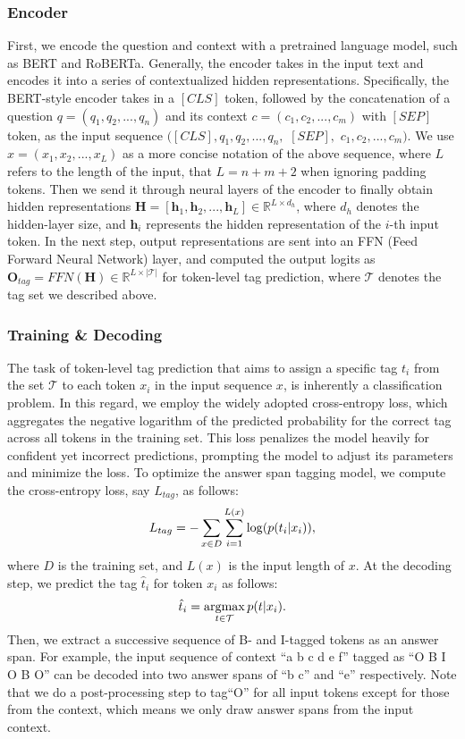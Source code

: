 \documentclass[a4paper]{cas-sc}
\newcommand{\1}[1]{\mathds{1}\left[#1\right]}
\newcommand{\argmax}{\operatornamewithlimits{argmax}}
\begin{document}
\subsubsection{Encoder}
First, we encode the question and context with a pretrained 
language model, such as BERT and RoBERTa.
Generally, the encoder takes in the input text and encodes it into 
a series of contextualized hidden representations.
Specifically, the BERT-style encoder takes in a
$[CLS] $ token, followed by
the concatenation of a question $q=(q_1, q_2, ..., q_n)$ and its context $c=(c_1, c_2, ..., c_m)$ with $[SEP]$  token,
as the input sequence $([CLS], q_1, q_2, ..., q_n, $ $[SEP], $ $c_1, c_2, ..., c_m)$.
We use $x=(x_1, x_2, ..., x_L)$ as a more concise notation of the above sequence, 
where $L$ refers to the length of the input, 
that $L=n+m+2$ when ignoring padding tokens.
Then we send it through neural layers of the encoder to finally obtain hidden representations 
$\mathbf{H}=\left[\mathbf{h}_1, \mathbf{h}_2, ..., \mathbf{h}_{L}\right] 
\in \mathbb{R}^{L\times d_h}$,
where $d_h$ denotes the hidden-layer size, and $\mathbf{h}_i$ represents the hidden representation of the $i$-th input token. 
In the next step, output representations are sent into 
an FFN (Feed Forward Neural Network) layer, 
and computed the output logits as 
$\mathbf{O}_{tag}=FFN(\mathbf{H})\in\mathbb{R}^{L\times |\mathcal{T}|}$ for token-level tag prediction,  
where $\mathcal{T}$ denotes the tag set we described above. 


\subsubsection{Training \& Decoding}
The task of token-level tag prediction that aims to assign a specific tag $t_i$ from the set $\mathcal{T}$ to each token $x_i$ in the input sequence $x$, is inherently a classification problem. In this regard,  we employ the widely adopted cross-entropy loss, which aggregates the negative logarithm of the predicted probability for the correct tag across all tokens in the training set. This loss penalizes the model heavily for confident yet incorrect predictions, prompting the model to adjust its parameters and minimize the loss. To optimize the answer span tagging model, we compute the cross-entropy loss, say $L_{tag}$, as follows:
\begin{equation}\label{eq:tag_loss}
	\centering
	L_{tag}=-\sum_{x\in D}\sum_{i=1}^{L(x)} \log (p(t_i | x_{i})) ,
\end{equation}
where $D$ is the training set, and $L(x)$ is the input length of $x$. 
At the decoding step, we predict the tag $\hat{t}_i$ for token $x_i$ as follows:
\begin{equation}\label{eq:ti1}
	\hat{t}_i=\argmax_{t\in \mathcal{T}} p(t | x_i).
\end{equation}
Then, we extract a successive sequence of 
B- and I-tagged tokens as an answer span. 
For example, the input sequence of context ``a b c d e f'' tagged as ``O B I O B O'' can be decoded into two 
answer spans of ``b c'' and ``e'' respectively. 
Note that we do a post-processing step to tag``O'' for all input tokens except for those from the context, 
which means we only draw answer spans from the input context. 
\end{document}
